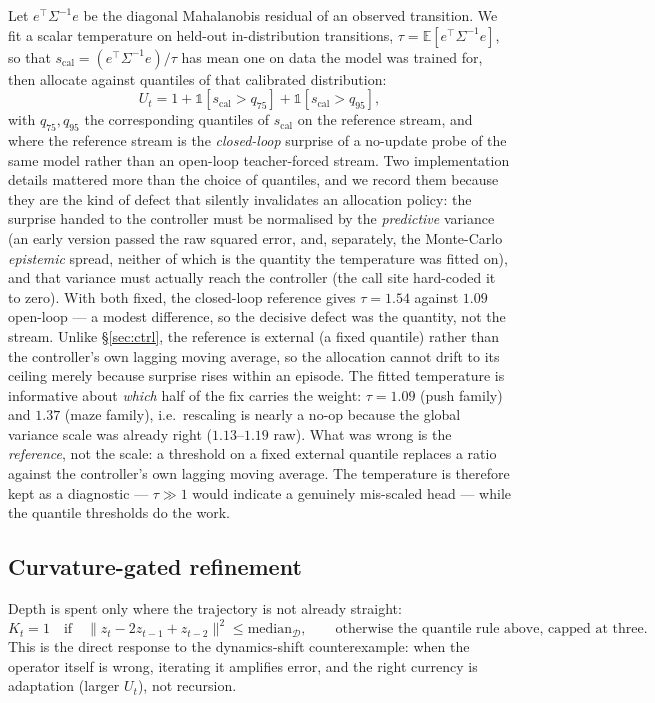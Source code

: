 Let $e^\top\Sigma^{-1}e$ be the diagonal Mahalanobis residual of an observed transition. We fit a
scalar temperature on held-out in-distribution transitions,
$\tau=\mathbb E[e^\top\Sigma^{-1}e]$, so that
$s_{\mathrm{cal}}=(e^\top\Sigma^{-1}e)/\tau$ has mean one on data the model was trained for, then
allocate against quantiles of that calibrated distribution:
\begin{equation}
U_t=1+\mathbb 1[s_{\mathrm{cal}}>q_{75}]+\mathbb 1[s_{\mathrm{cal}}>q_{95}],
\end{equation}
with $q_{75},q_{95}$ the corresponding quantiles of $s_{\mathrm{cal}}$ on the reference stream, and where the reference stream is the \emph{closed-loop} surprise of a no-update probe of the same model rather than an open-loop teacher-forced stream. Two implementation details mattered more than the choice of quantiles, and we record them because they are the kind of defect that silently invalidates an allocation policy: the surprise handed to the controller must be normalised by the \emph{predictive} variance (an early version passed the raw squared error, and, separately, the Monte-Carlo \emph{epistemic} spread, neither of which is the quantity the temperature was fitted on), and that variance must actually reach the controller (the call site hard-coded it to zero). With both fixed, the closed-loop reference gives $\tau=1.54$ against $1.09$ open-loop --- a modest difference, so the decisive defect was the quantity, not the stream.
Unlike \S\ref{sec:ctrl}, the reference is external (a fixed quantile) rather than the
controller's own lagging moving average, so the allocation cannot drift to its ceiling merely
because surprise rises within an episode. The fitted temperature is informative about \emph{which} half of the fix carries the weight:
$\tau=1.09$ (push family) and $1.37$ (maze family), i.e.\ rescaling is nearly a no-op because the
global variance scale was already right ($1.13$--$1.19$ raw). What was wrong is the
\emph{reference}, not the scale: a threshold on a fixed external quantile replaces a ratio
against the controller's own lagging moving average. The temperature is therefore kept as a
diagnostic --- $\tau\gg1$ would indicate a genuinely mis-scaled head --- while the quantile
thresholds do the work.

\subsection{Curvature-gated refinement}

Depth is spent only where the trajectory is not already straight:
\begin{equation}
K_t=1 \quad\text{if}\quad \big\|z_t-2z_{t-1}+z_{t-2}\big\|^2\le \mathrm{median}_{\mathcal D},
\qquad\text{otherwise the quantile rule above, capped at three.}
\end{equation}
This is the direct response to the dynamics-shift counterexample: when the operator itself is
wrong, iterating it amplifies error, and the right currency is adaptation (larger $U_t$), not
recursion.

